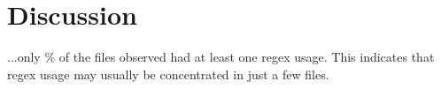 \section{Discussion}

...only \% of the files observed had at least one regex usage.  This indicates that regex usage may usually be concentrated in just a few files.
